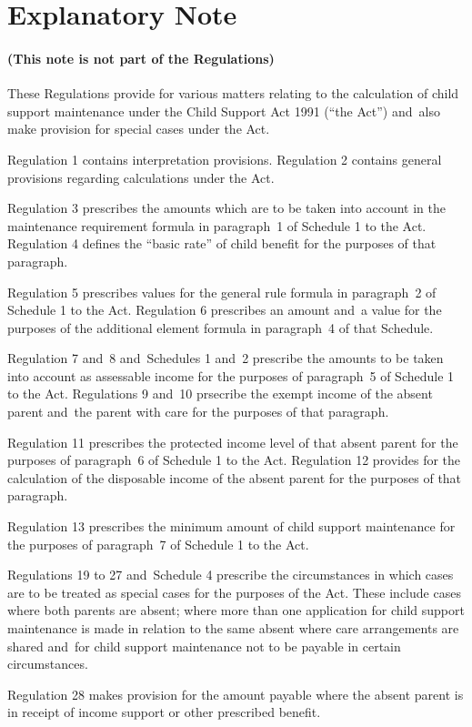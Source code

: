 \documentclass[12pt,a4paper]{article}
\begin{document}
\part{Explanatory Note}

\renewcommand\parthead{--- Explanatory Note}

\subsection*{(This note is not part of the Regulations)}

These Regulations provide for various matters relating to the calculation of child support maintenance under the Child Support Act 1991 (“the Act”) and~also make provision for special cases under the Act.

Regulation 1 contains interpretation provisions. Regulation 2 contains general provisions regarding calculations under the Act.

Regulation 3 prescribes the amounts which are to be taken into account in the maintenance requirement formula in paragraph~1 of Schedule 1 to the Act. Regulation 4 defines the “basic rate” of child benefit for the purposes of that paragraph.

Regulation 5 prescribes values for the general rule formula in paragraph~2 of Schedule 1 to the Act. Regulation 6 prescribes an amount and~a value for the purposes of the additional element formula in paragraph~4 of that Schedule.

Regulation 7 and~8 and~Schedules 1 and~2 prescribe the amounts to be taken into account as assessable income for the purposes of paragraph~5 of Schedule 1 to the Act. Regulations 9 and~10 prsecribe the exempt income of the absent parent and~the parent with care for the purposes of that paragraph.

Regulation 11 prescribes the protected income level of that absent parent for the purposes of paragraph~6 of Schedule 1 to the Act. Regulation 12 provides for the calculation of the disposable income of the absent parent for the purposes of that paragraph.

Regulation 13 prescribes the minimum amount of child support maintenance for the purposes of paragraph~7 of Schedule 1 to the Act.

Regulations 19 to 27 and~Schedule 4 prescribe the circumstances in which cases are to be treated as special cases for the purposes of the Act. These include cases where both parents are absent; where more than one application for child support maintenance is made in relation to the same absent where care arrangements are shared and~for child support maintenance not to be payable in certain circumstances.

Regulation 28 makes provision for the amount payable where the absent parent is in receipt of income support or other prescribed benefit. 
\end{document}
